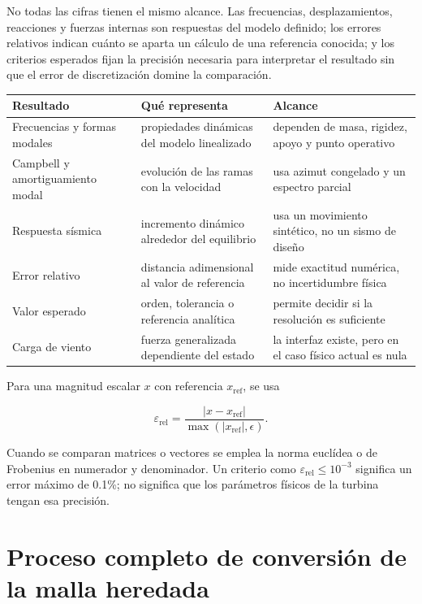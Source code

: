 \documentclass[oneside,a4paper,spanish,links]{amca}
\begin{document}
No todas las cifras tienen el mismo alcance. Las frecuencias, desplazamientos, reacciones y fuerzas internas son respuestas del modelo definido; los errores relativos indican cuánto se aparta un cálculo de una referencia conocida; y los criterios esperados fijan la precisión necesaria para interpretar el resultado sin que el error de discretización domine la comparación.

\begingroup
\small
\renewcommand{\arraystretch}{1.16}
\begin{center}
\begin{tabularx}{\textwidth}{@{}YYY@{}}
\toprule
\textbf{Resultado} & \textbf{Qué representa} & \textbf{Alcance} \\
\midrule
Frecuencias y formas modales & propiedades dinámicas del modelo linealizado & dependen de masa, rigidez, apoyo y punto operativo \\
Campbell y amortiguamiento modal & evolución de las ramas con la velocidad & usa azimut congelado y un espectro parcial \\
Respuesta sísmica & incremento dinámico alrededor del equilibrio & usa un movimiento sintético, no un sismo de diseño \\
Error relativo & distancia adimensional al valor de referencia & mide exactitud numérica, no incertidumbre física \\
Valor esperado & orden, tolerancia o referencia analítica & permite decidir si la resolución es suficiente \\
Carga de viento & fuerza generalizada dependiente del estado & la interfaz existe, pero en el caso físico actual es nula \\
\bottomrule
\end{tabularx}
\end{center}
\endgroup

Para una magnitud escalar $x$ con referencia $x_{\mathrm{ref}}$, se usa

\[
\varepsilon_{\mathrm{rel}}
=\frac{|x-x_{\mathrm{ref}}|}
{\max\!\left(|x_{\mathrm{ref}}|,\epsilon\right)}.
\]

Cuando se comparan matrices o vectores se emplea la norma euclídea o de Frobenius en numerador y denominador. Un criterio como $\varepsilon_{\mathrm{rel}}\leq10^{-3}$ significa un error máximo de 0.1\%; no significa que los parámetros físicos de la turbina tengan esa precisión.

\section{Proceso completo de conversión de la malla heredada}
\end{document}
